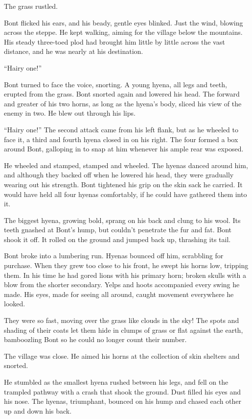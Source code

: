 The grass rustled.

Bont flicked his ears, and his beady, gentle eyes blinked. Just the wind, blowing across the steppe. He kept walking, aiming for the village below the mountains. His steady three-toed plod had brought him little by little across the vast distance, and he was nearly at his destination.

``Hairy one!''

Bont turned to face the voice, snorting. A young hyena, all legs and teeth, erupted from the grass. Bont snorted again and lowered his head. The forward and greater of his two horns, as long as the hyena's body, sliced his view of the enemy in two. He blew out through his lips.

``Hairy one!'' The second attack came from his left flank, but as he wheeled to face it, a third and fourth hyena closed in on his right. The four formed a box around Bont, galloping in to snap at him whenever his ample rear was exposed.

He wheeled and stamped, stamped and wheeled. The hyenas danced around him, and although they backed off when he lowered his head, they were gradually wearing out his strength. Bont tightened his grip on the skin sack he carried. It would have held all four hyenas comfortably, if he could have gathered them into it.

The biggest hyena, growing bold, sprang on his back and clung to his wool. Its teeth gnashed at Bont's hump, but couldn't penetrate the fur and fat. Bont shook it off. It rolled on the ground and jumped back up, thrashing its tail.

Bont broke into a lumbering run. Hyenas bounced off him, scrabbling for purchase. When they grew too close to his front, he swept his horns low, tripping them. In his time he had gored lions with his primary horn; broken skulls with a blow from the shorter secondary. Yelps and hoots accompanied every swing he made. His eyes, made for seeing all around, caught movement everywhere he looked.

They were so fast, moving over the grass like clouds in the sky! The spots and shading of their coats let them hide in clumps of grass or flat against the earth, bamboozling Bont so he could no longer count their number.

The village was close. He aimed his horns at the collection of skin shelters and snorted.

He stumbled as the smallest hyena rushed between his legs, and fell on the trampled pathway with a crash that shook the ground. Dust filled his eyes and his nose. The hyenas, triumphant, bounced on his hump and chased each other up and down his back.

